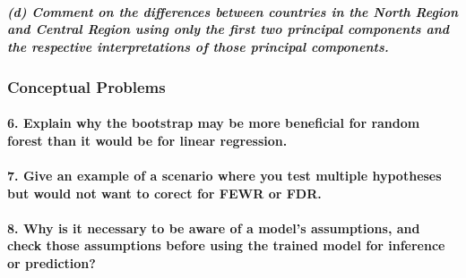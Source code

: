 \documentclass[
]{article}
\begin{document}
\hypertarget{d-comment-on-the-differences-between-countries-in-the-north-region-and-central-region-using-only-the-first-two-principal-components-and-the-respective-interpretations-of-those-principal-components.}{%
\subparagraph{(d) Comment on the differences between countries in the
North Region and Central Region using only the first two principal
components and the respective interpretations of those principal
components.}\label{d-comment-on-the-differences-between-countries-in-the-north-region-and-central-region-using-only-the-first-two-principal-components-and-the-respective-interpretations-of-those-principal-components.}}

\hypertarget{conceptual-problems}{%
\subsubsection{Conceptual Problems}\label{conceptual-problems}}

\hypertarget{explain-why-the-bootstrap-may-be-more-beneficial-for-random-forest-than-it-would-be-for-linear-regression.}{%
\paragraph{6. Explain why the bootstrap may be more beneficial for
random forest than it would be for linear
regression.}\label{explain-why-the-bootstrap-may-be-more-beneficial-for-random-forest-than-it-would-be-for-linear-regression.}}

\hypertarget{give-an-example-of-a-scenario-where-you-test-multiple-hypotheses-but-would-not-want-to-corect-for-fewr-or-fdr.}{%
\paragraph{7. Give an example of a scenario where you test multiple
hypotheses but would not want to corect for FEWR or
FDR.}\label{give-an-example-of-a-scenario-where-you-test-multiple-hypotheses-but-would-not-want-to-corect-for-fewr-or-fdr.}}

\hypertarget{why-is-it-necessary-to-be-aware-of-a-models-assumptions-and-check-those-assumptions-before-using-the-trained-model-for-inference-or-prediction}{%
\paragraph{8. Why is it necessary to be aware of a model's assumptions,
and check those assumptions before using the trained model for inference
or
prediction?}\label{why-is-it-necessary-to-be-aware-of-a-models-assumptions-and-check-those-assumptions-before-using-the-trained-model-for-inference-or-prediction}}
\end{document}
